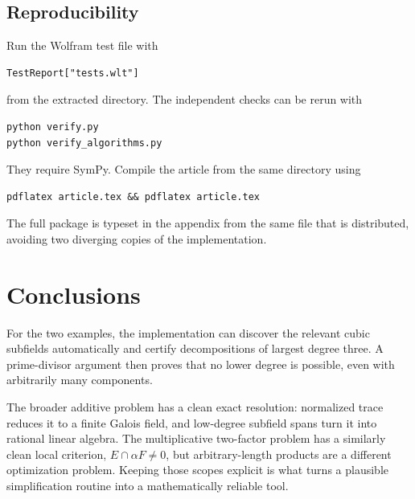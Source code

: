 \documentclass[11pt]{article}
\newcommand{\code}[1]{\texttt{\detokenize{#1}}}
\theoremstyle{definition}\newtheorem{definition}[theorem]{Definition}
\theoremstyle{remark}\newtheorem{remark}[theorem]{Remark}
\begin{document}
\subsection{Reproducibility}
Run the Wolfram test file with
\begin{lstlisting}
TestReport["tests.wlt"]
\end{lstlisting}
from the extracted directory. The independent checks can be rerun with
\begin{lstlisting}[language={}]
python verify.py
python verify_algorithms.py
\end{lstlisting}
They require SymPy. Compile the article from the same directory using
\begin{lstlisting}[language={}]
pdflatex article.tex && pdflatex article.tex
\end{lstlisting}
The full package is typeset in the appendix from the same \code{.wl} file that
is distributed, avoiding two diverging copies of the implementation.

\section{Conclusions}
For the two examples, the implementation can discover the relevant cubic
subfields automatically and certify decompositions of largest degree three.
A prime-divisor argument then proves that no lower degree is possible, even
with arbitrarily many components.

The broader additive problem has a clean exact resolution: normalized trace
reduces it to a finite Galois field, and low-degree subfield spans turn it into
rational linear algebra. The multiplicative two-factor problem has a similarly
clean local criterion, $E\cap\alpha F\ne0$, but arbitrary-length products are
a different optimization problem. Keeping those scopes explicit is what turns
a plausible simplification routine into a mathematically reliable tool.
\end{document}
